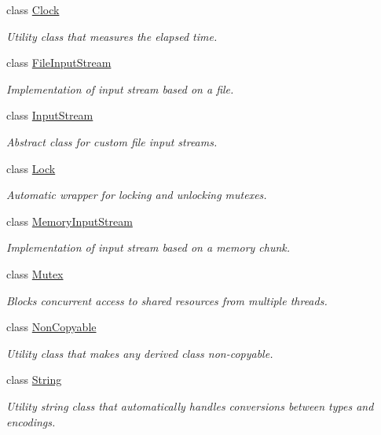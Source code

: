 \begin{DoxyCompactItemize}
class \hyperlink{classsf_1_1_clock}{Clock}
\begin{DoxyCompactList}\small\item\em Utility class that measures the elapsed time. \end{DoxyCompactList}\item 
class \hyperlink{classsf_1_1_file_input_stream}{File\-Input\-Stream}
\begin{DoxyCompactList}\small\item\em Implementation of input stream based on a file. \end{DoxyCompactList}\item 
class \hyperlink{classsf_1_1_input_stream}{Input\-Stream}
\begin{DoxyCompactList}\small\item\em Abstract class for custom file input streams. \end{DoxyCompactList}\item 
class \hyperlink{classsf_1_1_lock}{Lock}
\begin{DoxyCompactList}\small\item\em Automatic wrapper for locking and unlocking mutexes. \end{DoxyCompactList}\item 
class \hyperlink{classsf_1_1_memory_input_stream}{Memory\-Input\-Stream}
\begin{DoxyCompactList}\small\item\em Implementation of input stream based on a memory chunk. \end{DoxyCompactList}\item 
class \hyperlink{classsf_1_1_mutex}{Mutex}
\begin{DoxyCompactList}\small\item\em Blocks concurrent access to shared resources from multiple threads. \end{DoxyCompactList}\item 
class \hyperlink{classsf_1_1_non_copyable}{Non\-Copyable}
\begin{DoxyCompactList}\small\item\em Utility class that makes any derived class non-\/copyable. \end{DoxyCompactList}\item 
class \hyperlink{classsf_1_1_string}{String}
\begin{DoxyCompactList}\small\item\em Utility string class that automatically handles conversions between types and encodings. \end{DoxyCompactList}\item 

\end{DoxyCompactItemize}
